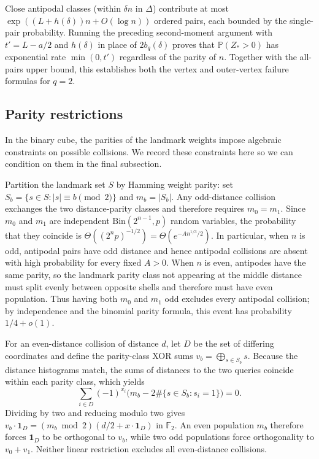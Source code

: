 Close antipodal classes (within $\delta n$ in $\Delta$) contribute at most $\exp((L+h(\delta))n+O(\log n))$ ordered pairs, each bounded by the single-pair probability. Running the preceding second-moment argument with $t'=L-a/2$ and $h(\delta)$ in place of $2b_q(\delta)$ proves that $\mathbb P(Z_*>0)$ has exponential rate $\min(0,t')$ regardless of the parity of $n$. Together with the all-pairs upper bound, this establishes both the vertex and outer-vertex failure formulas for $q=2$.

\subsection{Parity restrictions}
In the binary cube, the parities of the landmark weights impose algebraic constraints on possible collisions. We record these constraints here so we can condition on them in the final subsection.

Partition the landmark set $S$ by Hamming weight parity: set $S_b=\{s\in S:|s|\equiv b\pmod2\}$ and $m_b=|S_b|$. Any odd-distance collision exchanges the two distance-parity classes and therefore requires $m_0=m_1$. Since $m_0$ and $m_1$ are independent $\mathrm{Bin}(2^{n-1},p)$ random variables, the probability that they coincide is $\Theta((2^np)^{-1/2})=\Theta(e^{-A n^{1/3}/2})$. In particular, when $n$ is odd, antipodal pairs have odd distance and hence antipodal collisions are absent with high probability for every fixed $A>0$. When $n$ is even, antipodes have the same parity, so the landmark parity class not appearing at the middle distance must split evenly between opposite shells and therefore must have even population. Thus having both $m_0$ and $m_1$ odd excludes every antipodal collision; by independence and the binomial parity formula, this event has probability $1/4+o(1)$.

For an even-distance collision of distance $d$, let $D$ be the set of differing coordinates and define the parity-class XOR sums $v_b=\bigoplus_{s\in S_b}s$. Because the distance histograms match, the sums of distances to the two queries coincide within each parity class, which yields
\[
 \sum_{i\in D}(-1)^{x_i}\bigl(m_b-2\#\{s\in S_b:s_i=1\}\bigr)=0.
\]
Dividing by two and reducing modulo two gives $v_b\cdot\mathbf1_D=(m_b\bmod2)(d/2+x\cdot\mathbf1_D)$ in $\mathbb F_2$. An even population $m_b$ therefore forces $\mathbf1_D$ to be orthogonal to $v_b$, while two odd populations force orthogonality to $v_0+v_1$. Neither linear restriction excludes all even-distance collisions.

